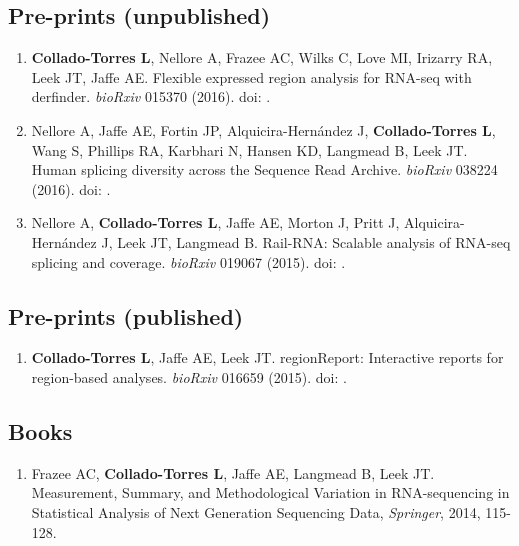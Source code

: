 \subsection{Pre-prints (unpublished)}
    \begin{enumerate}
        \item \textbf{Collado-Torres L}, Nellore A, Frazee AC, Wilks C, Love MI, Irizarry RA, Leek JT, Jaffe AE. Flexible expressed region analysis for RNA-seq with derfinder. \emph{bioRxiv} 015370 (2016). doi: .
        \item Nellore A, Jaffe AE, Fortin JP, Alquicira-Hernández J, \textbf{Collado-Torres L}, Wang S, Phillips RA, Karbhari N, Hansen KD, Langmead B, Leek JT. Human splicing diversity across the Sequence Read Archive. \emph{bioRxiv} 038224 (2016). doi: .
        \item Nellore A, \textbf{Collado-Torres L}, Jaffe AE, Morton J, Pritt J, Alquicira-Hernández J, Leek JT, Langmead B. Rail-RNA: Scalable analysis of RNA-seq splicing and coverage. \emph{bioRxiv} 019067 (2015). doi: .
    \end{enumerate}
\subsection{Pre-prints (published)}
    \begin{enumerate}
        \item \textbf{Collado-Torres L}, Jaffe AE, Leek JT. regionReport: Interactive reports for region-based analyses. \emph{bioRxiv} 016659 (2015). doi: .
    \end{enumerate}
\subsection{Books}
    \begin{enumerate}
        \item Frazee AC, \textbf{Collado-Torres L}, Jaffe AE, Langmead B, Leek JT. Measurement, Summary, and Methodological Variation in RNA-sequencing in Statistical Analysis of Next Generation Sequencing Data, \emph{Springer}, 2014, 115-128.
    \end{enumerate}

